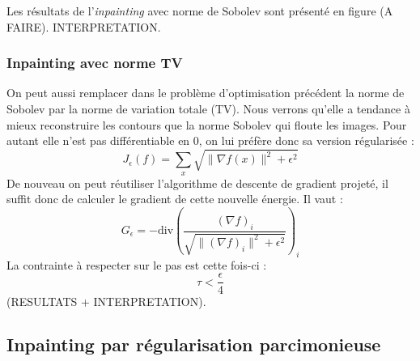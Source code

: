 Les résultats de l'\emph{inpainting} avec norme de Sobolev sont présenté en figure (A FAIRE). INTERPRETATION.

 
\subsubsection{Inpainting avec norme TV}

On peut aussi remplacer dans le problème d'optimisation précédent la norme de Sobolev par la norme de variation totale (TV). Nous verrons qu'elle a tendance à mieux reconstruire les contours que la norme Sobolev qui floute les images. Pour autant elle n'est pas différentiable en 0, on lui préfère donc sa version régularisée :
\begin{equation}
J_{\epsilon}(f) = \sum_x \sqrt{\|\nabla f(x) \|^2 + \epsilon^2}
\end{equation}
De nouveau on peut réutiliser l'algorithme de descente de gradient projeté, il suffit donc de calculer le gradient de cette nouvelle énergie. Il vaut : 
\begin{equation}
G_{\epsilon} = - \text{div} \left( \frac{(\nabla f)_i}{\sqrt{\| (\nabla f)_i \|^2 + \epsilon^2}}\right)_i
\end{equation}
La contrainte à respecter sur le pas est cette fois-ci :
\begin{equation}
\tau < \frac{\epsilon}{4}
\end{equation}
(RESULTATS + INTERPRETATION).


\subsection{Inpainting par régularisation parcimonieuse}